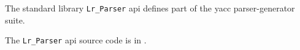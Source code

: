 
The standard library {\tt Lr\_Parser} api defines part of the yacc parser-generator suite.

The {\tt Lr\_Parser} api source code is in .
